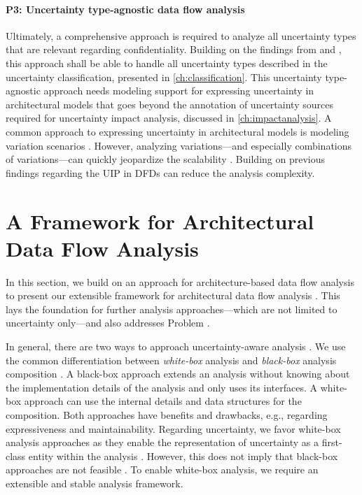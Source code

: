 \paragraph{P3: Uncertainty type-agnostic data flow analysis} \label{p:3:3}
Ultimately, a comprehensive approach is required to analyze all uncertainty types that are relevant regarding confidentiality.
Building on the findings from  and , this approach shall be able to handle all uncertainty types described in the uncertainty classification, presented in \autoref{ch:classification}.
This uncertainty type-agnostic approach needs modeling support for expressing uncertainty in architectural models that goes beyond the annotation of uncertainty sources required for uncertainty impact analysis, discussed in \autoref{ch:impactanalysis}.
A common approach to expressing uncertainty in architectural models is modeling variation scenarios \cite{troya_uncertainty_2021,walter_architecture-based_2023}.
However, analyzing variations---and especially combinations of variations---can quickly jeopardize the scalability \cite{walter_context-based_2023,walter_architecture-based_2023-1}.
Building on previous findings regarding the \acf{UIP} in \acp{DFD} can reduce the analysis complexity.





\section{A Framework for Architectural Data Flow Analysis}%
\label{sec:confidentialityanalysis:framework}

In this section, we build on an approach for architecture-based data flow analysis \cite{seifermann_architectural_2016,seifermann_data-driven_2019,seifermann_detecting_2022,seifermann_unified_2021,seifermann_architectural_2022} to present our extensible framework for architectural data flow analysis \cite{boltz_extensible_2024}.
This lays the foundation for further analysis approaches---which are not limited to uncertainty only---and also addresses Problem .

In general, there are two ways to approach uncertainty-aware analysis \cite{acosta_uncertainty_2022,perez-palacin_dealing_2014}.
We use the common differentiation between \emph{white-box} analysis and \emph{black-box} analysis composition \cite{taghavi_survey_2023,heinrich_composing_2021}.
A black-box approach extends an analysis without knowing about the implementation details of the analysis and only uses its interfaces.
A white-box approach can use the internal details and data structures for the composition.
Both approaches have benefits and drawbacks, e.g., regarding expressiveness and maintainability.
Regarding uncertainty, we favor white-box analysis approaches as they enable the representation of uncertainty as a first-class entity within the analysis \cite{garlan_software_2010}.
However, this does not imply that black-box approaches are not feasible \cite{walter_architectural_2022}.
To enable white-box analysis, we require an extensible and stable analysis framework.

